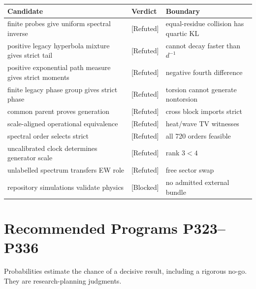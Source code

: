 \documentclass[11pt,a4paper,openany]{report}
\newcommand{\statusRefuted}{\textcolor{finred}{[Refuted]}}
\begin{document}
\begin{center}
\begingroup\small
\setlength{\tabcolsep}{2.5pt}
\renewcommand{\arraystretch}{1.16}
\begin{longtable}{@{}p{}p{}p{}@{}}
\toprule
\textbf{Candidate} & \textbf{Verdict} & \textbf{Boundary} \\
\midrule
\endhead
finite probes give uniform spectral inverse & \statusRefuted{} & equal-residue collision has quartic KL \\
positive legacy hyperbola mixture gives strict tail & \statusRefuted{} & cannot decay faster than \(d^{-1}\) \\
positive exponential path measure gives strict moments & \statusRefuted{} & negative fourth difference \\
finite legacy phase group gives strict phase & \statusRefuted{} & torsion cannot generate nontorsion \\
common parent proves generation & \statusRefuted{} & cross block imports strict \\
scale-aligned operational equivalence & \statusRefuted{} & heat/\allowbreak{}wave TV witnesses \\
spectral order selects strict & \statusRefuted{} & all 720 orders feasible \\
uncalibrated clock determines generator scale & \statusRefuted{} & rank \(3<4\) \\
unlabelled spectrum transfers EW role & \statusRefuted{} & free sector swap \\
repository simulations validate physics & [Blocked] & no admitted external bundle \\
\bottomrule
\end{longtable}
\endgroup
\end{center}

\chapter{Recommended Programs P323--P336}

Probabilities estimate the chance of a decisive result, including a rigorous no-go. They are research-planning judgments.
\end{document}

